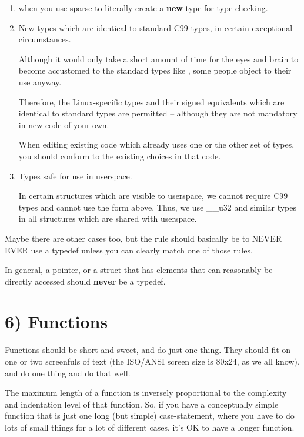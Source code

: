 \documentclass[a4paper,8pt,english]{sphinxmanual}
\begin{document}
\begin{enumerate}
\item {} 
when you use sparse to literally create a \textbf{new} type for
type-checking.

\item {} 
New types which are identical to standard C99 types, in certain
exceptional circumstances.

Although it would only take a short amount of time for the eyes and
brain to become accustomed to the standard types like ,
some people object to their use anyway.

Therefore, the Linux-specific  types and their
signed equivalents which are identical to standard types are
permitted -- although they are not mandatory in new code of your
own.

When editing existing code which already uses one or the other set
of types, you should conform to the existing choices in that code.

\item {} 
Types safe for use in userspace.

In certain structures which are visible to userspace, we cannot
require C99 types and cannot use the  form above. Thus, we
use \_\_u32 and similar types in all structures which are shared
with userspace.

\end{enumerate}

Maybe there are other cases too, but the rule should basically be to NEVER
EVER use a typedef unless you can clearly match one of those rules.

In general, a pointer, or a struct that has elements that can reasonably
be directly accessed should \textbf{never} be a typedef.


\section{6) Functions}
\label{process/coding-style:functions}
Functions should be short and sweet, and do just one thing.  They should
fit on one or two screenfuls of text (the ISO/ANSI screen size is 80x24,
as we all know), and do one thing and do that well.

The maximum length of a function is inversely proportional to the
complexity and indentation level of that function.  So, if you have a
conceptually simple function that is just one long (but simple)
case-statement, where you have to do lots of small things for a lot of
different cases, it's OK to have a longer function.
\end{document}

